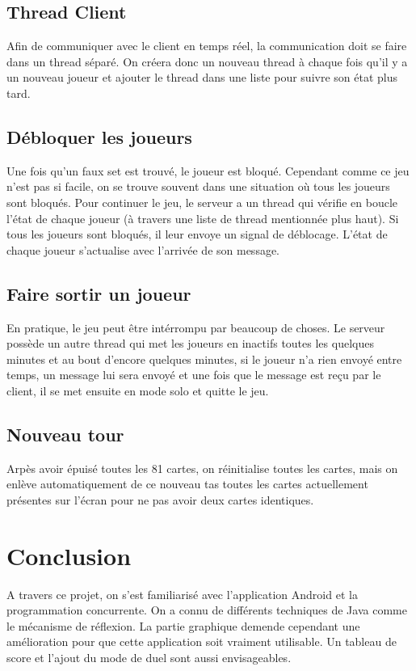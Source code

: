 \documentclass[paper=a4, french]{scrartcl} %
\begin{document}
\subsection{Thread Client}
Afin de communiquer avec le client en temps réel, la communication doit se faire dans un thread séparé. On créera donc un nouveau thread à chaque fois qu'il y a un nouveau joueur et ajouter le thread dans une liste pour suivre son état plus tard.

\subsection{Débloquer les joueurs}
Une fois qu'un faux set est trouvé, le joueur est bloqué. Cependant comme ce jeu n'est pas si facile, on se trouve souvent dans une situation où tous les joueurs sont bloqués. Pour continuer le jeu, le serveur a un thread qui vérifie en boucle l'état de chaque joueur (à travers une liste de thread mentionnée plus haut). Si tous les joueurs sont bloqués, il leur envoye un signal de déblocage. L'état de chaque joueur s'actualise avec l'arrivée de son message.

\subsection{Faire sortir un joueur}
En pratique, le jeu peut être intérrompu par beaucoup de choses. Le serveur possède un autre thread qui met les joueurs en inactifs toutes les quelques minutes et au bout d'encore quelques minutes, si le joueur n'a rien envoyé entre temps, un message lui sera envoyé et une fois que le message est reçu par le client, il se met ensuite en mode solo et quitte le jeu.

\subsection{Nouveau tour}
Arpès avoir épuisé toutes les 81 cartes, on réinitialise toutes les cartes, mais on enlève automatiquement de ce nouveau tas toutes les cartes actuellement présentes sur l'écran pour ne pas avoir deux cartes identiques.



\section{Conclusion}


A travers ce projet, on s'est familiarisé avec l'application Android et la programmation concurrente. On a connu de différents techniques de Java comme le mécanisme de réflexion. La partie graphique demende cependant une amélioration pour que cette application soit vraiment utilisable. Un tableau de score et l'ajout du mode de duel sont aussi envisageables.

\end{document}
